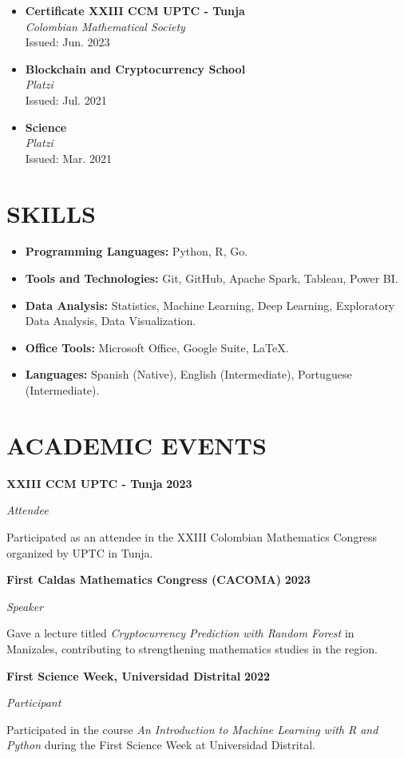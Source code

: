 \documentclass[paper=a4,fontsize=11pt]{scrartcl} %
\newcommand{\sepspace}{\vspace*{0.8em}}
\newcommand{\NewPart}[1]{\section*{\uppercase{#1}}}
\newcommand{\EducationEntry}[4]{%
  \noindent \textbf{#1} \hfill \textbf{#2} \par
  \noindent \textit{#3} \par
  \noindent \small #4 
  \normalsize \par \sepspace
}
\begin{document}
\begin{itemize}[leftmargin=*, noitemsep]
  \item \textbf{Certificate XXIII CCM UPTC - Tunja} \\
        \textit{Colombian Mathematical Society} \\
        Issued: Jun. 2023

  \item \textbf{Blockchain and Cryptocurrency School} \\
        \textit{Platzi} \\
        Issued: Jul. 2021 

  \item \textbf{Science} \\
        \textit{Platzi} \\
        Issued: Mar. 2021 
\end{itemize}

\sepspace

\NewPart{Skills}

\begin{itemize}[leftmargin=*, noitemsep]
    \item \textbf{Programming Languages:} Python, R, Go.
    \item \textbf{Tools and Technologies:} Git, GitHub, Apache Spark, Tableau, Power BI.
    \item \textbf{Data Analysis:} Statistics, Machine Learning, Deep Learning, Exploratory Data Analysis, Data Visualization.
    \item \textbf{Office Tools:} Microsoft Office, Google Suite, \LaTeX.
    \item \textbf{Languages:} Spanish (Native), English (Intermediate), Portuguese (Intermediate).
\end{itemize}

\sepspace

\NewPart{Academic Events}

\EducationEntry{XXIII CCM UPTC - Tunja}{2023}{Attendee}{%
Participated as an attendee in the XXIII Colombian Mathematics Congress organized by UPTC in Tunja.
}

\EducationEntry{First Caldas Mathematics Congress (CACOMA)}{2023}{Speaker}{%
Gave a lecture titled \textit{Cryptocurrency Prediction with Random Forest} in Manizales, contributing to strengthening mathematics studies in the region.
}

\EducationEntry{First Science Week, Universidad Distrital}{2022}{Participant}{%
Participated in the course \textit{An Introduction to Machine Learning with R and Python} during the First Science Week at Universidad Distrital.
}

\sepspace
\end{document}

